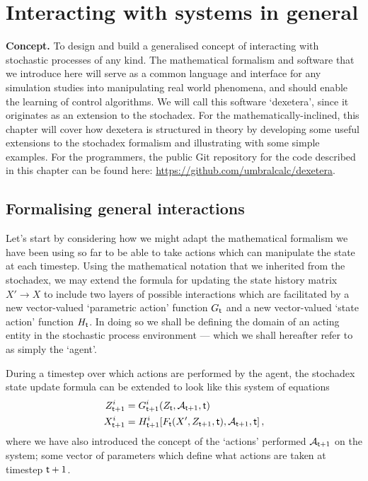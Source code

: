 \chapter{\sffamily Interacting with systems in general}

{\bfseries\sffamily Concept.} To design and build a generalised concept of interacting with stochastic processes of any kind. The mathematical formalism and software that we introduce here will serve as a common language and interface for any simulation studies into manipulating real world phenomena, and should enable the learning of control algorithms. We will call this software `dexetera', since it originates as an extension to the stochadex. For the mathematically-inclined, this chapter will cover how dexetera is structured in theory by developing some useful extensions to the stochadex formalism and illustrating with some simple examples. For the programmers, the public Git repository for the code described in this chapter can be found here: \href{https://github.com/umbralcalc/dexetera}{https://github.com/umbralcalc/dexetera}.

\section{\sffamily Formalising general interactions}

Let's start by considering how we might adapt the mathematical formalism we have been using so far to be able to take actions which can manipulate the state at each timestep. Using the mathematical notation that we inherited from the stochadex, we may extend the formula for updating the state history matrix $X'\rightarrow X$ to include two layers of possible interactions which are facilitated by a new vector-valued `parametric action' function $G_{{\sf t}}$ and a new vector-valued `state action' function $H_{{\sf t}}$. In doing so we shall be defining the domain of an acting entity in the stochastic process environment --- which we shall hereafter refer to as simply the `agent'.

During a timestep over which actions are performed by the agent, the stochadex state update formula can be extended to look like this system of equations
\begin{align}
Z_{{\sf t}+1}^i &= G_{{\sf t}+1}^i(Z_{{\sf t}}, {\cal A}_{{\sf t}+1}, {\sf t}) \label{eq:generalised-param-actions} \\
X_{{\sf t}+1}^i &= H^i_{{\sf t}+1}[F_{\sf t}(X', Z_{{\sf t}+1}, {\sf t}), {\cal A}_{{\sf t}+1}, {\sf t}] \label{eq:generalised-state-actions} \,,
\end{align}
where we have also introduced the concept of the `actions' performed ${\cal A}_{{\sf t}+1}$ on the system; some vector of parameters which define what actions are taken at timestep ${\sf t}+1$.

